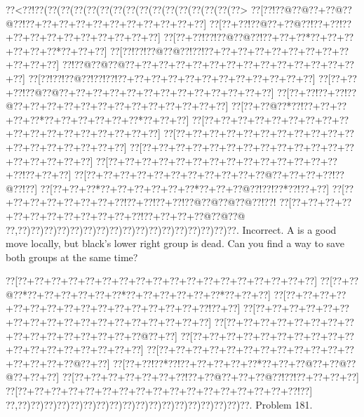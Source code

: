\documentclass[a5paper]{article}
\begin{document}
\begin{center}
{\goo
\0??<\0??!\0??(\0??(\0??(\0??(\0??(\0??(\0??(\0??(\0??(\0??(\0??(\0??(\0??(\0??(\0??(\0??>
\0??[\0??!\0??@\0??@\0??+\0??@\0??@\0??!\0??+\0??+\0??+\0??+\0??+\0??+\0??+\0??+\0??+\0??+\0??]
\0??[\0??+\0??!\0??@\0??+\0??@\0??!\0??+\0??!\0??+\0??+\0??+\0??+\0??+\0??+\0??+\0??+\0??+\0??]
\0??[\0??+\0??!\0??!\0??@\0??@\0??!\0??+\0??+\0??*\0??+\0??+\0??+\0??+\0??+\0??*\0??+\0??+\0??]
\0??[\0??!\0??!\0??@\0??@\0??!\0??!\0??+\0??+\0??+\0??+\0??+\0??+\0??+\0??+\0??+\0??+\0??+\0??]
\0??!\0??@\0??@\0??@\0??+\0??+\0??+\0??+\0??+\0??+\0??+\0??+\0??+\0??+\0??+\0??+\0??+\0??+\0??]
\0??[\0??!\0??!\0??@\0??!\0??!\0??!\0??+\0??+\0??+\0??+\0??+\0??+\0??+\0??+\0??+\0??+\0??+\0??]
\0??[\0??+\0??+\0??!\0??@\0??@\0??+\0??+\0??+\0??+\0??+\0??+\0??+\0??+\0??+\0??+\0??+\0??+\0??]
\0??[\0??+\0??!\0??+\0??!\0??@\0??+\0??+\0??+\0??+\0??+\0??+\0??+\0??+\0??+\0??+\0??+\0??+\0??]
\0??[\0??+\0??@\0??*\0??!\0??+\0??+\0??+\0??+\0??*\0??+\0??+\0??+\0??+\0??+\0??*\0??+\0??+\0??]
\0??[\0??+\0??+\0??+\0??+\0??+\0??+\0??+\0??+\0??+\0??+\0??+\0??+\0??+\0??+\0??+\0??+\0??+\0??]
\0??[\0??+\0??+\0??+\0??+\0??+\0??+\0??+\0??+\0??+\0??+\0??+\0??+\0??+\0??+\0??+\0??+\0??+\0??]
\0??[\0??+\0??+\0??+\0??+\0??+\0??+\0??+\0??+\0??+\0??+\0??+\0??+\0??+\0??+\0??+\0??+\0??+\0??]
\0??[\0??+\0??+\0??+\0??+\0??+\0??+\0??+\0??+\0??+\0??+\0??+\0??+\0??+\0??+\0??!\0??+\0??+\0??]
\0??[\0??+\0??+\0??+\0??+\0??+\0??+\0??+\0??+\0??+\0??+\0??@\0??+\0??+\0??+\0??!\0??@\0??!\0??]
\0??[\0??+\0??+\0??*\0??+\0??+\0??+\0??+\0??+\0??*\0??+\0??+\0??@\0??!\0??!\0??*\0??!\0??+\0??]
\0??[\0??+\0??+\0??+\0??+\0??+\0??+\0??+\0??!\0??+\0??!\0??+\0??!\0??@\0??@\0??@\0??@\0??!\0??!
\0??[\0??+\0??+\0??+\0??+\0??+\0??+\0??+\0??+\0??+\0??+\0??+\0??!\0??+\0??+\0??+\0??@\0??@\0??@
\0??,\0??)\0??)\0??)\0??)\0??)\0??)\0??)\0??)\0??)\0??)\0??)\0??)\0??)\0??)\0??)\0??)\0??.
}
Incorrect. A is a good move locally, but black's lower right group is dead. Can you find a way to save both groups at the same time?

\end{center}
\newpage
\begin{center}
{\goo
\0??[\0??+\0??+\0??+\0??+\0??+\0??+\0??+\0??+\0??+\0??+\0??+\0??+\0??+\0??+\0??+\0??+\0??+\0??]
\0??[\0??+\0??@\0??*\0??+\0??+\0??+\0??+\0??+\0??*\0??+\0??+\0??+\0??+\0??+\0??*\0??+\0??+\0??]
\0??[\0??+\0??+\0??+\0??+\0??+\0??+\0??+\0??+\0??+\0??+\0??+\0??+\0??+\0??+\0??+\0??!\0??+\0??]
\0??[\0??+\0??+\0??+\0??+\0??+\0??+\0??+\0??+\0??+\0??+\0??+\0??+\0??+\0??+\0??+\0??+\0??+\0??]
\0??[\0??+\0??+\0??+\0??+\0??+\0??+\0??+\0??+\0??+\0??+\0??+\0??+\0??+\0??+\0??+\0??@\0??+\0??]
\0??[\0??+\0??+\0??+\0??+\0??+\0??+\0??+\0??+\0??+\0??+\0??+\0??+\0??+\0??+\0??+\0??+\0??+\0??]
\0??[\0??+\0??+\0??+\0??+\0??+\0??+\0??+\0??+\0??+\0??+\0??+\0??+\0??+\0??+\0??+\0??@\0??+\0??]
\0??[\0??+\0??!\0??*\0??!\0??+\0??+\0??+\0??+\0??*\0??+\0??+\0??@\0??+\0??@\0??@\0??+\0??+\0??]
\0??[\0??+\0??+\0??+\0??+\0??+\0??+\0??!\0??+\0??@\0??+\0??+\0??@\0??!\0??!\0??+\0??+\0??+\0??]
\0??[\0??+\0??+\0??+\0??+\0??+\0??+\0??+\0??+\0??+\0??+\0??+\0??+\0??+\0??+\0??+\0??+\0??!\0??]
\0??,\0??)\0??)\0??)\0??)\0??)\0??)\0??)\0??)\0??)\0??)\0??)\0??)\0??)\0??)\0??)\0??)\0??)\0??.
}
Problem 181.

\end{center}
\end{document}
